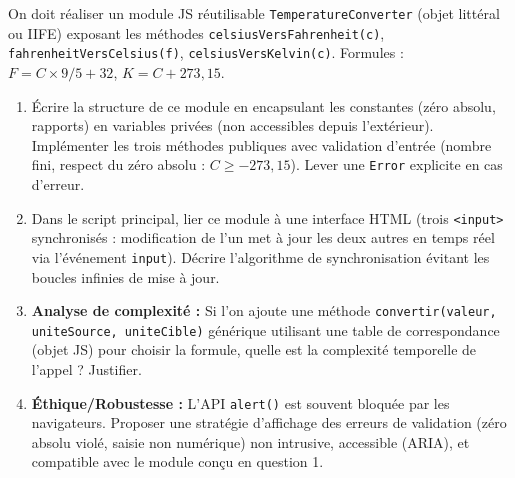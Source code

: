 \documentclass[11pt]{article}
\begin{document}
\begin{exercice}
On doit réaliser un module JS réutilisable \texttt{TemperatureConverter} (objet littéral ou IIFE) exposant les méthodes \texttt{celsiusVersFahrenheit(c)}, \texttt{fahrenheitVersCelsius(f)}, \texttt{celsiusVersKelvin(c)}. Formules : $F = C \times 9/5 + 32$, $K = C + 273,15$.

\begin{enumerate}
    \item Écrire la structure de ce module en encapsulant les constantes (zéro absolu, rapports) en variables privées (non accessibles depuis l'extérieur). Implémenter les trois méthodes publiques avec validation d'entrée (nombre fini, respect du zéro absolu : $C \ge -273,15$). Lever une \texttt{Error} explicite en cas d'erreur.
    \item Dans le script principal, lier ce module à une interface HTML (trois \texttt{<input>} synchronisés : modification de l'un met à jour les deux autres en temps réel via l'événement \texttt{input}). Décrire l'algorithme de synchronisation évitant les boucles infinies de mise à jour.
    \item \textbf{Analyse de complexité :} Si l'on ajoute une méthode \texttt{convertir(valeur, uniteSource, uniteCible)} générique utilisant une table de correspondance (objet JS) pour choisir la formule, quelle est la complexité temporelle de l'appel ? Justifier.
    \item \textbf{Éthique/Robustesse :} L'API \texttt{alert()} est souvent bloquée par les navigateurs. Proposer une stratégie d'affichage des erreurs de validation (zéro absolu violé, saisie non numérique) non intrusive, accessible (ARIA), et compatible avec le module conçu en question 1.
\end{enumerate}
\end{exercice}
\end{document}
